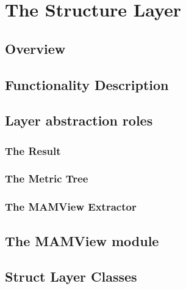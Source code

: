 \chapter{The Structure Layer}
\label{cha:structurelayer}

\section{Overview}

\section{Functionality Description}

\section{Layer abstraction roles}

\subsection{The Result}

\subsection{The Metric Tree}

\subsection{The MAMView Extractor}

\section{The MAMView module}

\section{Struct Layer Classes}

